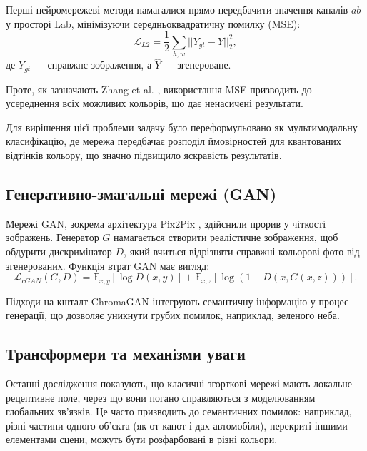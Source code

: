             Перші нейромережеві методи намагалися прямо передбачити значення каналів $ab$ у просторі Lab, мінімізуючи середньоквадратичну помилку (MSE):
            \begin{equation*}
                \mathcal{L}_{L2} = \frac{1}{2} \sum_{h,w} || Y_{gt} - \hat{Y} ||_2^2,
            \end{equation*}
            де $Y_{gt}$ --- справжнє зображення, а $\hat{Y}$ --- згенероване.

            Проте, як зазначають Zhang et al. \cite{2016-colorful-image-colorization}, використання MSE призводить до усереднення всіх можливих кольорів, що дає ненасичені результати.

            Для вирішення цієї проблеми задачу було переформульовано як мультимодальну класифікацію, де мережа передбачає розподіл ймовірностей для квантованих відтінків кольору, що значно підвищило яскравість результатів.

        \subsection{Генеративно-змагальні мережі (GAN)}
            Мережі GAN, зокрема архітектура Pix2Pix \cite{2017-image-to-image-translation}, здійснили прорив у чіткості зображень.
            Генератор $G$ намагається створити реалістичне зображення, щоб обдурити дискримінатор $D$, який вчиться відрізняти справжні кольорові фото від згенерованих.
            Функція втрат GAN має вигляд:
            \begin{equation*}
                \mathcal{L}_{cGAN}(G, D) = \mathbb{E}_{x, y}[\log D(x, y)] + \mathbb{E}_{x, z}[\log(1 - D(x, G(x, z)))].
            \end{equation*}
        
            Підходи на кшталт ChromaGAN \cite{2020-chromagan} інтегрують семантичну інформацію у процес генерації, що дозволяє уникнути грубих помилок, наприклад, зеленого неба.

        \subsection{Трансформери та механізми уваги}
            Останні дослідження \cite{2021-colorization-transformer, 2022-unicolor, 2023-ddcolor} показують, що класичні згорткові мережі мають локальне рецептивне поле, через що вони погано справляються з моделюванням глобальних зв'язків. Це часто призводить до семантичних помилок: наприклад, різні частини одного об'єкта (як-от капот і дах автомобіля), перекриті іншими елементами сцени, можуть бути розфарбовані в різні кольори.
            
